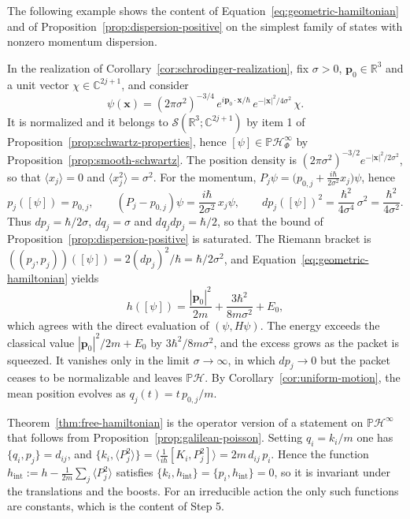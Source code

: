 The following example shows the content of Equation~\eqref{eq:geometric-hamiltonian} and of Proposition~\ref{prop:dispersion-positive} on the simplest family of states with nonzero momentum dispersion.

\begin{example}\label{ex:gaussian-packet}
	In the realization of Corollary~\ref{cor:schrodinger-realization}, fix $\sigma>0$, $\mathbf{p}_0\in\mathbb{R}^3$ and a unit vector $\chi\in\mathbb{C}^{2j+1}$, and consider
	\begin{equation*}
		\psi(\mathbf{x})=(2\pi\sigma^2)^{-3/4}\,e^{i\mathbf{p}_0\cdot\mathbf{x}/\hbar}\,e^{-|\mathbf{x}|^2/4\sigma^2}\,\chi.
	\end{equation*}
	It is normalized and it belongs to $\mathcal{S}(\mathbb{R}^3;\mathbb{C}^{2j+1})$ by item 1 of Proposition~\ref{prop:schwartz-properties}, hence $[\psi]\in\mathbb{P}\mathcal{H}^\infty_\Phi$ by Proposition~\ref{prop:smooth-schwartz}. The position density is $(2\pi\sigma^2)^{-3/2}e^{-|\mathbf{x}|^2/2\sigma^2}$, so that $\langle x_j\rangle=0$ and $\langle x_j^2\rangle=\sigma^2$. For the momentum, $P_j\psi=\big(p_{0,j}+\tfrac{i\hbar}{2\sigma^2}x_j\big)\psi$, hence
	\begin{equation*}
		p_j([\psi])=p_{0,j},\qquad (P_j-p_{0,j})\psi=\frac{i\hbar}{2\sigma^2}\,x_j\psi,\qquad d p_j([\psi])^2=\frac{\hbar^2}{4\sigma^4}\,\sigma^2=\frac{\hbar^2}{4\sigma^2}.
	\end{equation*}
	Thus $d p_j=\hbar/2\sigma$, $d q_j=\sigma$ and $d q_jd p_j=\hbar/2$, so that the bound of Proposition~\ref{prop:dispersion-positive} is saturated. The Riemann bracket is $((p_j,p_j))([\psi])=2(d p_j)^2/\hbar=\hbar/2\sigma^2$, and Equation~\eqref{eq:geometric-hamiltonian} yields
	\begin{equation*}
		h([\psi])=\frac{|\mathbf{p}_0|^2}{2m}+\frac{3\hbar^2}{8m\sigma^2}+E_0,
	\end{equation*}
	which agrees with the direct evaluation of $(\psi,H\psi)$. The energy exceeds the classical value $|\mathbf{p}_0|^2/2m+E_0$ by $3\hbar^2/8m\sigma^2$, and the excess grows as the packet is squeezed. It vanishes only in the limit $\sigma\to\infty$, in which $d p_j\to0$ but the packet ceases to be normalizable and leaves $\mathbb{P}\mathcal{H}$. By Corollary~\ref{cor:uniform-motion}, the mean position evolves as $q_j(t)=t\,p_{0,j}/m$.
\end{example}

\begin{remark}\label{rem:poisson-shadow}
	Theorem~\ref{thm:free-hamiltonian} is the operator version of a statement on $\mathbb{P}\mathcal{H}^\infty$ that follows from Proposition~\ref{prop:galilean-poisson}. Setting $q_i=k_i/m$ one has $\{q_i,p_j\}=d_{ij}$, and $\{k_i,\langle P_j^2\rangle\}=\langle\tfrac{1}{i\hbar}[K_i,P_j^2]\rangle=2m\,d_{ij}\,p_i$. Hence the function $h_{\mathrm{int}}:=h-\tfrac{1}{2m}\sum_j\langle P_j^2\rangle$ satisfies $\{k_i,h_{\mathrm{int}}\}=\{p_i,h_{\mathrm{int}}\}=0$, so it is invariant under the translations and the boosts. For an irreducible action the only such functions are constants, which is the content of Step 5.
\end{remark}

